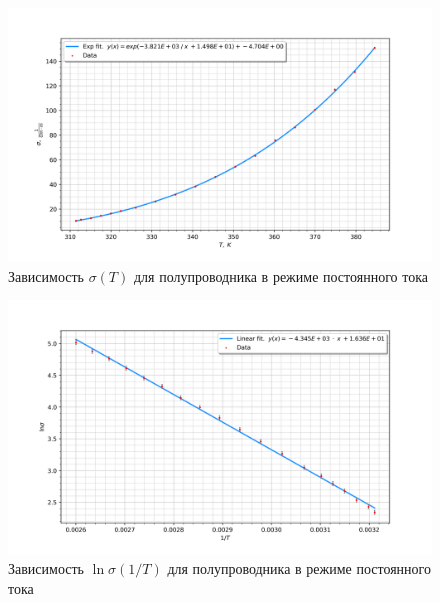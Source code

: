 \documentclass[a4paper]{article}
\begin{document}
\begin{figure}[h]
    \begin{center}
        \includegraphics[scale = 0.75]{graph3.png}
        \caption{Зависимость $\sigma(T) $ для полупроводника в режиме постоянного тока}
        \label{gr3}
    \end{center}
\end{figure}

\begin{figure}[h]
    \begin{center}
        \includegraphics[scale = 0.75]{graph4.png}
        \caption{Зависимость $\ln{\sigma} (1/T)$ для полупроводника в режиме постоянного тока}
        \label{gr4}
    \end{center}
\end{figure}
\end{document}
